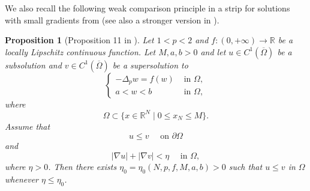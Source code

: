 \documentclass[reqno]{amsart}
\theoremstyle{plain}
\newtheorem{proposition}[theorem]{Proposition}
\theoremstyle{definition}
\theoremstyle{remark}
\begin{document}
	We also recall the following weak comparison principle in a strip for solutions with small gradients from \cite[Proposition 11]{MR4771444} (see also a stronger version in \cite[Theorem 1.6]{MR3303939}).
	\begin{proposition}[Proposition 11 in \cite{MR4771444}]\label{prop:degenerate}
		Let $1<p<2$ and $f:(0,+\infty)\to\mathbb{R}$ be a locally Lipschitz continuous function.
		Let $M,a,b>0$ and let $u\in C^1(\overline{\Omega})$ be a subsolution and $v\in C^1(\overline{\Omega})$ be a supersolution to
		\[
		\begin{cases}
			-\Delta_p w = f(w) &\text{ in } \Omega,\\
			a<w<b &\text{ in } \Omega,
		\end{cases}
		\]
		where
		\[
		\Omega \subset \{x\in\mathbb{R}^N \mid 0 \le x_N \le M\}.
		\]
		Assume that
		\[
		u \le v \quad\text{ on } \partial \Omega
		\]
		and
		\[
		|\nabla u| + |\nabla v| < \eta \quad\text{ in } \Omega,
		\]
		where $\eta>0$.
		Then there exists $\eta_0=\eta_0(N,p,f,M,a,b)>0$ such that $u \le v$ in $\Omega$ whenever $\eta\le\eta_0$.
	\end{proposition}
	
\end{document}
